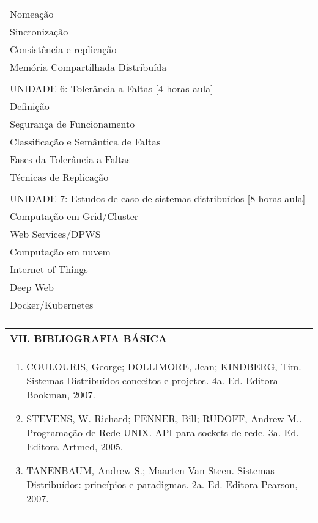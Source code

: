 \documentclass[12pt]{article}
\begin{document}
\begin{longtable}{|L{1.025\textwidth}|}
Nomeação\\
Sincronização\\
Consistência e replicação\\
Memória Compartilhada Distribuída  \\
\\
UNIDADE 6: Tolerância a Faltas [4 horas-aula]\\
Definição\\
Segurança de Funcionamento \\
Classificação e Semântica de Faltas\\
Fases da Tolerância a Faltas\\
Técnicas de Replicação \\
\\
UNIDADE 7: Estudos de caso de sistemas distribuídos [8 horas-aula]\\
Computação em Grid/Cluster\\
Web Services/DPWS\\
Computação em nuvem\\
Internet of Things\\
Deep Web\\
Docker/Kubernetes\\

\\ \hline
\end{longtable} 




\begin{longtable}{|L{1.025\textwidth}|} \hline
%
{\bf VII. BIBLIOGRAFIA BÁSICA} \\ \hline
\begin{enumerate}
%
\item COULOURIS, George; DOLLIMORE, Jean; KINDBERG, Tim. Sistemas Distribuídos conceitos e projetos. 4a. Ed. Editora Bookman, 2007. 
\item STEVENS, W. Richard; FENNER, Bill; RUDOFF, Andrew M.. Programação de Rede UNIX. API para sockets de rede. 3a. Ed. Editora Artmed, 2005. 
\item TANENBAUM, Andrew S.; Maarten Van Steen. Sistemas Distribuídos: princípios e paradigmas. 2a. Ed. Editora Pearson, 2007.
\end{enumerate}
 \\ \hline
\end{longtable}


\newpage
\end{document}
